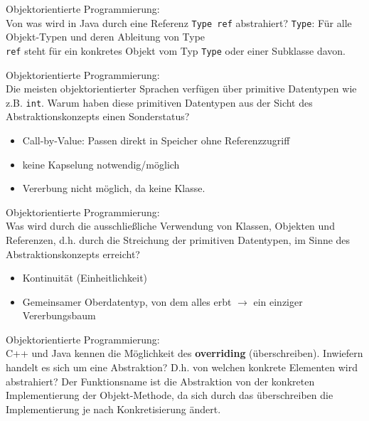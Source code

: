 \begin{card}
	Objektorientierte Programmierung:\\
	Von was wird in Java durch eine Referenz \texttt{Type ref} abstrahiert?
	\hr
	\texttt{Type}: Für alle Objekt-Typen und deren Ableitung von Type\\
	\texttt{ref} steht für ein konkretes Objekt vom Typ \texttt{Type} oder einer Subklasse davon.
\end{card}

\begin{card}
	Objektorientierte Programmierung:\\
	Die meisten objektorientierter Sprachen verfügen über primitive Datentypen wie z.B. \texttt{int}. Warum haben diese primitiven Datentypen aus der Sicht des Abstraktionskonzepts einen Sonderstatus?
	\hr
	\begin{itemize}
	\item Call-by-Value: Passen direkt in Speicher ohne Referenzzugriff
	\item keine Kapselung notwendig/möglich
	\item Vererbung nicht möglich, da keine Klasse.
	\end{itemize}
\end{card}

\begin{card}
	Objektorientierte Programmierung:\\
	Was wird durch die ausschließliche Verwendung von Klassen, Objekten und Referenzen, d.h. durch die Streichung der primitiven Datentypen, im Sinne des Abstraktionskonzepts erreicht?
	\hr
	\begin{itemize}
	\item Kontinuität (Einheitlichkeit)
	\item Gemeinsamer Oberdatentyp, von dem alles erbt $\rightarrow$ ein einziger Vererbungsbaum
	\end{itemize}
\end{card}

\begin{card}
	Objektorientierte Programmierung:\\
	C++ und Java kennen die Möglichkeit des \textbf{overriding} (überschreiben). Inwiefern handelt es sich um eine Abstraktion? D.h. von welchen konkrete Elementen wird abstrahiert? 
	\hr
	Der Funktionsname ist die Abstraktion von der konkreten Implementierung der Objekt-Methode, da sich durch das überschreiben die Implementierung je nach Konkretisierung ändert.
\end{card}

